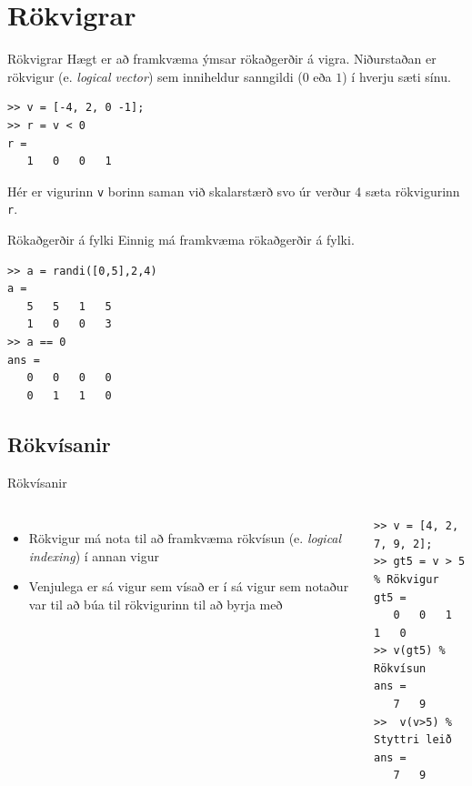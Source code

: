 \documentclass[handout]{beamer}
\begin{document}
\section{Rökvigrar}

\begin{frame}[fragile]{Rökvigrar}
\vspace{\baselineskip}
Hægt er að framkvæma ýmsar rökaðgerðir á vigra. Niðurstaðan er rökvigur (e. \emph{logical vector}) sem inniheldur sanngildi ($0$ eða $1$) í hverju sæti sínu.
\begin{verbatim}
>> v = [-4, 2, 0 -1];
>> r = v < 0
r =
   1   0   0   1
\end{verbatim}
Hér er vigurinn \texttt{v} borinn saman við skalarstærð svo úr verður 4 sæta rökvigurinn \texttt{r}.
\end{frame}

\begin{frame}[fragile]{Rökaðgerðir á fylki}
\vspace{\baselineskip}
Einnig má framkvæma rökaðgerðir á fylki.
\begin{verbatim}
>> a = randi([0,5],2,4)
a =
   5   5   1   5
   1   0   0   3
>> a == 0
ans =
   0   0   0   0
   0   1   1   0
\end{verbatim}
\end{frame}

\subsection{Rökvísanir}
\begin{frame}[fragile]{Rökvísanir}
\begin{columns}
\begin{itemize}
 \item Rökvigur má nota til að framkvæma rökvísun (e. \emph{logical indexing}) í annan vigur
 \item Venjulega er sá vigur sem vísað er í sá vigur sem notaður var til að búa til rökvigurinn til að byrja með
\end{itemize}
\begin{verbatim}
>> v = [4, 2, 7, 9, 2];
>> gt5 = v > 5 % Rökvigur
gt5 =
   0   0   1   1   0
>> v(gt5) % Rökvísun
ans =
   7   9
>>  v(v>5) % Styttri leið
ans =
   7   9
\end{verbatim}
\end{columns}
\end{frame}
\end{document}
